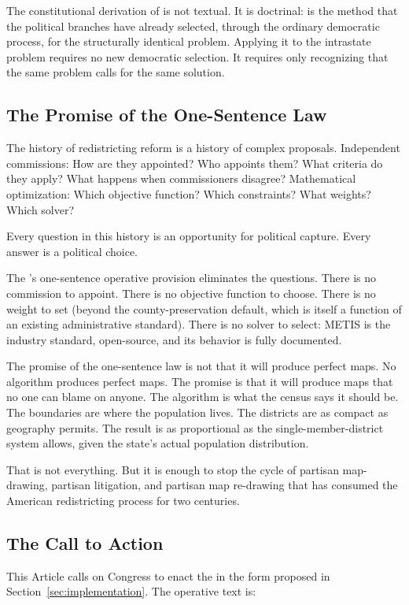 The constitutional derivation of \ar{} is not textual.
It is doctrinal: \hh{} is the method that the political branches have already
selected, through the ordinary democratic process, for the structurally identical
problem.
Applying it to the intrastate problem requires no new democratic selection.
It requires only recognizing that the same problem calls for the same solution.

\subsection{The Promise of the One-Sentence Law}

The history of redistricting reform is a history of complex proposals.
Independent commissions: How are they appointed? Who appoints them?
What criteria do they apply? What happens when commissioners disagree?
Mathematical optimization: Which objective function? Which constraints?
What weights? Which solver?

Every question in this history is an opportunity for political capture.
Every answer is a political choice.

The \dia{}'s one-sentence operative provision eliminates the questions.
There is no commission to appoint.
There is no objective function to choose.
There is no weight to set (beyond the county-preservation default, which is
itself a function of an existing administrative standard).
There is no solver to select: METIS is the industry standard, open-source,
and its behavior is fully documented.

The promise of the one-sentence law is not that it will produce perfect maps.
No algorithm produces perfect maps.
The promise is that it will produce maps that no one can blame on anyone.
The algorithm is what the census says it should be.
The boundaries are where the population lives.
The districts are as compact as geography permits.
The result is as proportional as the single-member-district system allows,
given the state's actual population distribution.

That is not everything.
But it is enough to stop the cycle of partisan map-drawing, partisan
litigation, and partisan map re-drawing that has consumed the American
redistricting process for two centuries.

\subsection{The Call to Action}

This Article calls on Congress to enact the \dia{} in the form proposed
in Section~\ref{sec:implementation}.
The operative text is:

